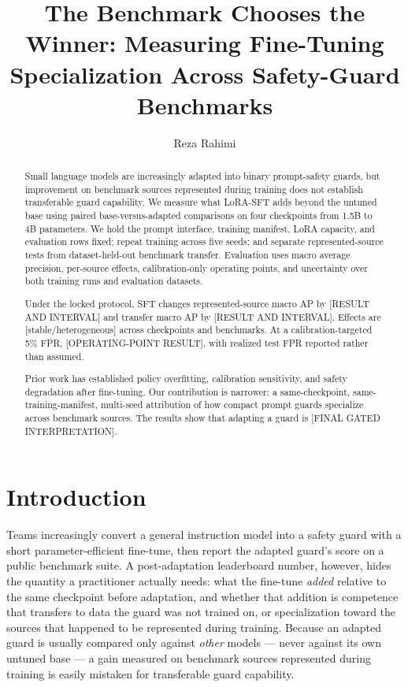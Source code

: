 \documentclass[sigconf,nonacm]{acmart}
\begin{document}
\title{The Benchmark Chooses the Winner: Measuring Fine-Tuning Specialization Across Safety-Guard Benchmarks}

\author{Reza Rahimi}

\begin{abstract}
Small language models are increasingly adapted into binary prompt-safety guards, but improvement on benchmark sources represented during training does not establish transferable guard capability. We measure what LoRA-SFT adds beyond the untuned base using paired base-versus-adapted comparisons on four checkpoints from 1.5B to 4B parameters. We hold the prompt interface, training manifest, LoRA capacity, and evaluation rows fixed; repeat training across five seeds; and separate represented-source tests from dataset-held-out benchmark transfer. Evaluation uses macro average precision, per-source effects, calibration-only operating points, and uncertainty over both training runs and evaluation datasets.

Under the locked protocol, SFT changes represented-source macro AP by [RESULT AND INTERVAL] and transfer macro AP by [RESULT AND INTERVAL]. Effects are [stable/heterogeneous] across checkpoints and benchmarks. At a calibration-targeted 5\% FPR, [OPERATING-POINT RESULT], with realized test FPR reported rather than assumed.

Prior work has established policy overfitting, calibration sensitivity, and safety degradation after fine-tuning. Our contribution is narrower: a same-checkpoint, same-training-manifest, multi-seed attribution of how compact prompt guards specialize across benchmark sources. The results show that adapting a guard is [FINAL GATED INTERPRETATION].
\end{abstract}

\maketitle

\section{Introduction}
\label{sec:intro}

Teams increasingly convert a general instruction model into a safety guard with a short parameter-efficient fine-tune, then report the adapted guard's score on a public benchmark suite. A post-adaptation leaderboard number, however, hides the quantity a practitioner actually needs: what the fine-tune \emph{added} relative to the same checkpoint before adaptation, and whether that addition is competence that transfers to data the guard was not trained on, or specialization toward the sources that happened to be represented during training. Because an adapted guard is usually compared only against \emph{other} models --- never against its own untuned base --- a gain measured on benchmark sources represented during training is easily mistaken for transferable guard capability.
\end{document}
